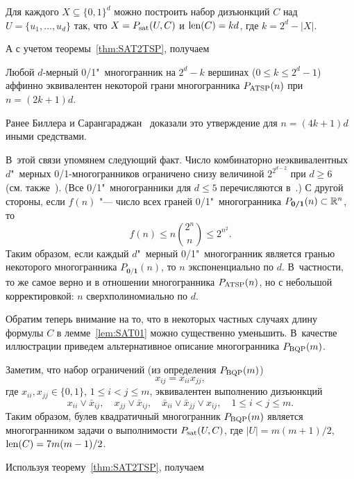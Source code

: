 \begin{lemma} %
\label{lem:SAT01}
Для каждого $X\subseteq \{0,1\}^d$ можно построить набор дизъюнкций $C$ над $U=\{u_1,\dots,u_d\}$ так, что $X = P_{\textup{sat}}(U,C)$ и $\operatorname{len}(C) = k d$, где $k = 2^d - |X|$.
\end{lemma}

А с учетом теоремы~\ref{thm:SAT2TSP}, получаем

\begin{corollary}
\label{cor:01toTSP}
Любой $d$-мерный 0/1"~многогранник на $2^d - k$ вершинах ($0 \le k \le 2^d - 1$) аффинно эквивалентен некоторой грани многогранника $P_{\textup{ATSP}}(n)$ при $n = (2k+1)d$.
\end{corollary}

Ранее Биллера и Сарангараджан~\cite{Billera:1996} доказали это утверждение для $n = (4k+1)d$ иными средствами.

В~этой связи упомянем следующий факт.
Число комбинаторно неэквивалентных $d$"~мерных 0/1-многогранников ограничено снизу величиной $2^{2^{d-2}}$ при $d\ge 6$~\cite[Proposition 8]{Ziegler:2000} (см. также~\cite[с.~102, упр.~2.6]{ZieglerBook}).
(Все 0/1"~многогранники для $d \le 5$ перечисляются в~\cite{Aichholzer:2000}.)
С другой стороны, если $f(n)$ "--- число всех граней 0/1"~многогранника $P_{\textbf{0/1}}(n) \subset \mathbb{R}^n$, то
\[
f(n) \le n \binom{2^n}{n} \le 2^{n^2}.
\]
Таким образом, если каждый $d$"~мерный 0/1"~многогранник является гранью некоторого многогранника $P_{\textbf{0/1}}(n)$, то $n$ экспоненциально по $d$.
В~частности, то же самое верно и в отношении многогранника $P_{\textup{ATSP}}(n)$, но с небольшой корректировкой: $n$ сверхполиномиально по $d$.

Обратим теперь внимание на то, что в некоторых частных случаях длину формулы $C$ в лемме~\ref{lem:SAT01} можно существенно уменьшить.
В~качестве иллюстрации приведем альтернативное описание многогранника $P_{\textup{BQP}}(m)$.

Заметим, что набор ограничений (из определения $P_{\textup{BQP}}(m)$)
\[
x_{ij} = x_{ii} x_{jj}, 
\]
где $x_{ii}, x_{jj} \in \{0,1\}$, $1\le i < j \le m$,
эквивалентен выполнению дизъюнкций
\[
x_{ii} \vee \bar{x}_{ij}, \quad
x_{jj} \vee \bar{x}_{ij}, \quad 
\bar{x}_{ii} \vee \bar{x}_{jj} \vee x_{ij}, \quad
1 \le i < j \le m.
\]
Таким образом, булев квадратичный многогранник $P_{\textup{BQP}}(m)$ является
многогранником задачи о выполнимости $P_{\textup{sat}}(U, C)$, где $|U|=m(m+1)/2$, $\operatorname{len}(C)=7m(m-1)/2$.

Используя теорему~\ref{thm:SAT2TSP}, получаем

